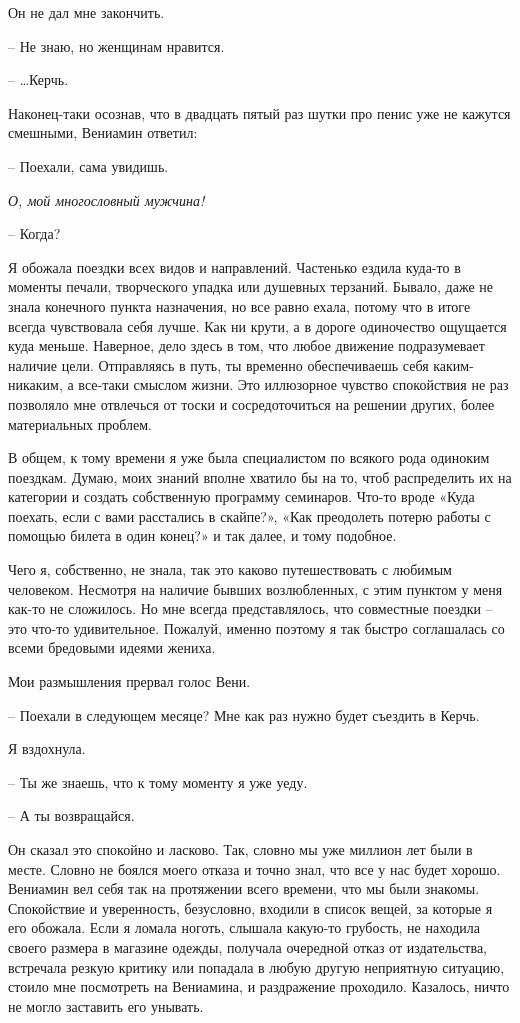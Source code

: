 \documentclass[
]{book}
\begin{document}
Он не дал мне закончить.

-- Не знаю, но женщинам нравится.

-- \ldots Керчь.

Наконец-таки осознав, что в двадцать пятый раз шутки про пенис уже не кажутся смешными, Вениамин ответил:

-- Поехали, сама увидишь.

\emph{О, мой многословный мужчина!}

-- Когда?

Я обожала поездки всех видов и направлений. Частенько ездила куда-то в моменты печали, творческого упадка или душевных терзаний. Бывало, даже не знала конечного пункта назначения, но все равно ехала, потому что в итоге всегда чувствовала себя лучше. Как ни крути, а в дороге одиночество ощущается куда меньше. Наверное, дело здесь в том, что любое движение подразумевает наличие цели. Отправляясь в путь, ты временно обеспечиваешь себя каким-никаким, а все-таки смыслом жизни. Это иллюзорное чувство спокойствия не раз позволяло мне отвлечься от тоски и сосредоточиться на решении других, более материальных проблем.

В общем, к тому времени я уже была специалистом по всякого рода одиноким поездкам. Думаю, моих знаний вполне хватило бы на то, чтоб распределить их на категории и создать собственную программу семинаров. Что-то вроде «Куда поехать, если с вами расстались в скайпе?», «Как преодолеть потерю работы с помощью билета в один конец?» и так далее, и тому подобное.

Чего я, собственно, не знала, так это каково путешествовать с любимым человеком. Несмотря на наличие бывших возлюбленных, с этим пунктом у меня как-то не сложилось. Но мне всегда представлялось, что совместные поездки -- это что-то удивительное. Пожалуй, именно поэтому я так быстро соглашалась со всеми бредовыми идеями жениха.

Мои размышления прервал голос Вени.

-- Поехали в следующем месяце? Мне как раз нужно будет съездить в Керчь.

Я вздохнула.

-- Ты же знаешь, что к тому моменту я уже уеду.

-- А ты возвращайся.

Он сказал это спокойно и ласково. Так, словно мы уже миллион лет были в месте. Словно не боялся моего отказа и точно знал, что все у нас будет хорошо. Вениамин вел себя так на протяжении всего времени, что мы были знакомы. Спокойствие и уверенность, безусловно, входили в список вещей, за которые я его обожала. Если я ломала ноготь, слышала какую-то грубость, не находила своего размера в магазине одежды, получала очередной отказ от издательства, встречала резкую критику или попадала в любую другую неприятную ситуацию, стоило мне посмотреть на Вениамина, и раздражение проходило. Казалось, ничто не могло заставить его унывать.
\end{document}
